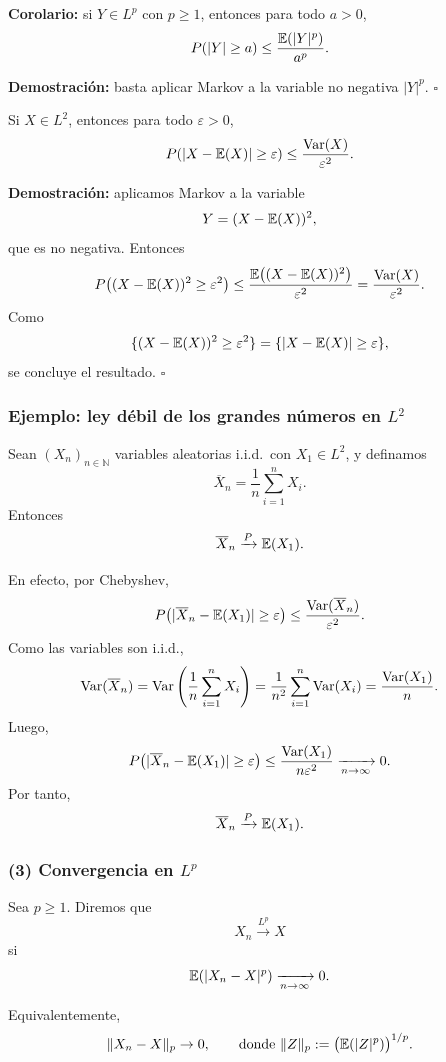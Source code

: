 \medskip

\noindent
\textbf{Corolario:} si \(Y\in L^p\) con \(p\geq 1\), entonces para todo \(a>0\),
\[
P(|Y|\geq a)\leq \frac{\mathbb{E}(|Y|^p)}{a^p}.
\]

\textbf{Demostración:} basta aplicar Markov a la variable no negativa \(|Y|^p\).
\hfill \(\square\)

\begin{prop}
Si \(X\in L^2\), entonces para todo \(\varepsilon>0\),
\[
P(|X-\mathbb{E}(X)|\geq \varepsilon)\leq \frac{\mathrm{Var}(X)}{\varepsilon^2}.
\]
\end{prop}

\textbf{Demostración:} aplicamos Markov a la variable
\[
Y=(X-\mathbb{E}(X))^2,
\]
que es no negativa. Entonces
\[
P\big((X-\mathbb{E}(X))^2\geq \varepsilon^2\big)
\leq
\frac{\mathbb{E}\big((X-\mathbb{E}(X))^2\big)}{\varepsilon^2}
=
\frac{\mathrm{Var}(X)}{\varepsilon^2}.
\]
Como
\[
\{(X-\mathbb{E}(X))^2\geq \varepsilon^2\}
=
\{|X-\mathbb{E}(X)|\geq \varepsilon\},
\]
se concluye el resultado.
\hfill \(\square\)

\subsubsection*{Ejemplo: ley débil de los grandes números en \(L^2\)}

Sean \((X_n)_{n\in\mathbb{N}}\) variables aleatorias i.i.d.\ con \(X_1\in L^2\), y definamos
\[
\overline{X}_n=\frac1n\sum_{i=1}^n X_i.
\]
Entonces
\[
\overline{X}_n\xrightarrow{P}\mathbb{E}(X_1).
\]

En efecto, por Chebyshev,
\[
P\big(|\overline{X}_n-\mathbb{E}(X_1)|\geq \varepsilon\big)
\leq
\frac{\mathrm{Var}(\overline{X}_n)}{\varepsilon^2}.
\]
Como las variables son i.i.d.,
\[
\mathrm{Var}(\overline{X}_n)
=
\mathrm{Var}\left(\frac1n\sum_{i=1}^n X_i\right)
=
\frac{1}{n^2}\sum_{i=1}^n \mathrm{Var}(X_i)
=
\frac{\mathrm{Var}(X_1)}{n}.
\]
Luego,
\[
P\big(|\overline{X}_n-\mathbb{E}(X_1)|\geq \varepsilon\big)
\leq
\frac{\mathrm{Var}(X_1)}{n\varepsilon^2}
\xrightarrow[n\to\infty]{}0.
\]
Por tanto,
\[
\overline{X}_n\xrightarrow{P}\mathbb{E}(X_1).
\]

\subsubsection*{(3) Convergencia en \(L^p\)}

Sea \(p\geq 1\). Diremos que
\[
X_n\xrightarrow{L^p}X
\]
si
\[
\mathbb{E}(|X_n-X|^p)\xrightarrow[n\to\infty]{}0.
\]

Equivalentemente,
\[
\|X_n-X\|_p\to 0,
\qquad
\text{donde }
\|Z\|_p:=\big(\mathbb{E}(|Z|^p)\big)^{1/p}.
\]

